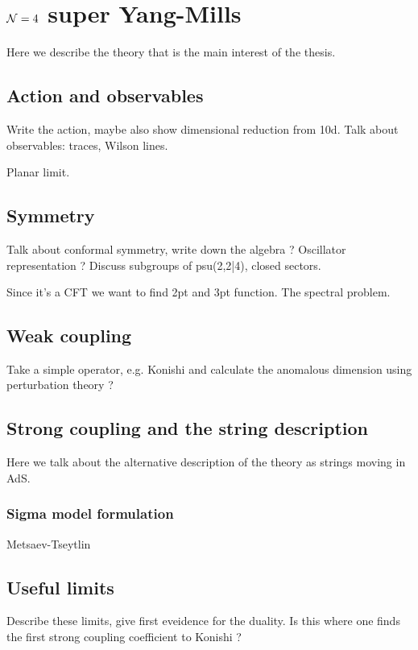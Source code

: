 
\section{$\mathcal{N}=4$ super Yang-Mills}

Here we describe the theory that is the main interest of the thesis.

\subsection{Action and observables}

Write the action, maybe also show dimensional reduction from 10d. Talk about observables: traces, Wilson lines. 

Planar limit.

\subsection{Symmetry}

Talk about conformal symmetry, write down the algebra ? Oscillator representation ? Discuss subgroups of psu(2,2|4), closed sectors. 

Since it's a CFT we want to find 2pt and 3pt function. The spectral problem.

\subsection{Weak coupling}

Take a simple operator, e.g. Konishi and calculate the anomalous dimension using perturbation theory ?

\subsection{Strong coupling and the string description}

Here we talk about the alternative description of the theory as strings moving in AdS.

\subsubsection{Sigma model formulation}

Metsaev-Tseytlin

\subsection{Useful limits}

Describe these limits, give first eveidence for the duality. Is this where one finds the first strong coupling coefficient to Konishi ?